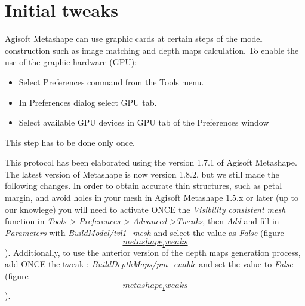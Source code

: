 \documentclass[
]{book}
\theoremstyle{definition}
\theoremstyle{definition}
\theoremstyle{definition}
\theoremstyle{definition}
\theoremstyle{remark}
\begin{document}
\hypertarget{initial-tweaks}{%
\section{Initial tweaks}\label{initial-tweaks}}

Agisoft Metashape can use graphic cards at certain steps of the model
construction such as image matching and depth maps calculation. To
enable the use of the graphic hardware (GPU):

\begin{itemize}
\item
  Select Preferences command from the Tools menu.
\item
  In Preferences dialog select GPU tab.
\item
  Select available GPU devices in GPU tab of the Preferences window
\end{itemize}

This step has to be done only once.

This protocol has been elaborated using the version 1.7.1 of Agisoft
Metashape. The latest version of Metashape is now version 1.8.2, but we
still made the following changes. In order to obtain accurate thin
structures, such as petal margin, and avoid holes in your mesh in
Agisoft Metashape 1.5.x or later (up to our knowlege) you will need to
activate ONCE the \emph{Visibility consistent mesh} function in \emph{Tools \textgreater{}
Preferences \textgreater{} Advanced \textgreater Tweaks}, then \emph{Add} and fill in \emph{Parameters}
with \emph{BuildModel/tvl1\_mesh} and select the value as \emph{False} (figure
\protect\hyperlink{metashape_tweaks}{\[metashape_tweaks\]}). Additionally, to use the anterior
version of the depth maps generation process, add ONCE the tweak :
\emph{BuildDepthMaps/pm\_enable} and set the value to \emph{False} (figure
\protect\hyperlink{metashape_tweaks}{\[metashape_tweaks\]}).
\end{document}
